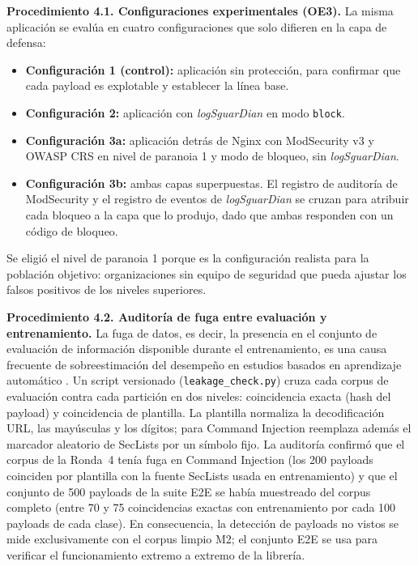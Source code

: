 \textbf{Procedimiento 4.1. Configuraciones experimentales (OE3).} La misma aplicación se evalúa
en cuatro configuraciones que solo difieren en la capa de defensa:

\begin{itemize}
    \item \textbf{Configuración 1 (control):} aplicación sin protección, para confirmar que cada
    payload es explotable y establecer la línea base.
    \item \textbf{Configuración 2:} aplicación con \textit{logSguarDian} en modo \texttt{block}.
    \item \textbf{Configuración 3a:} aplicación detrás de Nginx con ModSecurity v3 \cite{owasp2026modsecurity} y OWASP CRS
    \cite{owaspcrs} en nivel de paranoia 1 y modo de bloqueo, sin \textit{logSguarDian}.
    \item \textbf{Configuración 3b:} ambas capas superpuestas. El registro de auditoría de
    ModSecurity y el registro de eventos de \textit{logSguarDian} se cruzan para atribuir cada
    bloqueo a la capa que lo produjo, dado que ambas responden con un código de bloqueo.
\end{itemize}

Se eligió el nivel de paranoia 1 porque es la configuración realista para la población
objetivo: organizaciones sin equipo de seguridad que pueda ajustar los falsos positivos de los
niveles superiores.

\textbf{Procedimiento 4.2. Auditoría de fuga entre evaluación y entrenamiento.}
\label{subsec:met-fuga}
La fuga de datos, es decir, la presencia en el conjunto de evaluación de información disponible
durante el entrenamiento, es una causa frecuente de sobreestimación del desempeño en estudios
basados en aprendizaje automático \cite{kapoor2023}. Un script versionado
(\texttt{leakage\_check.py}) cruza cada corpus de evaluación contra cada partición en dos
niveles: coincidencia exacta (hash del payload) y coincidencia de plantilla. La plantilla
normaliza la decodificación URL, las mayúsculas y los dígitos; para Command Injection reemplaza
además el marcador aleatorio de SecLists por un símbolo fijo. La auditoría confirmó que el corpus
de la Ronda~4 tenía fuga en Command Injection (los 200 payloads coinciden por plantilla con la
fuente SecLists usada en entrenamiento) y que el conjunto de 500 payloads de la suite E2E se
había muestreado del corpus completo (entre 70 y 75 coincidencias exactas con entrenamiento por
cada 100 payloads de cada clase). En consecuencia, la detección de payloads no vistos se mide
exclusivamente con el corpus limpio M2; el conjunto E2E se usa para verificar el funcionamiento
extremo a extremo de la librería.

